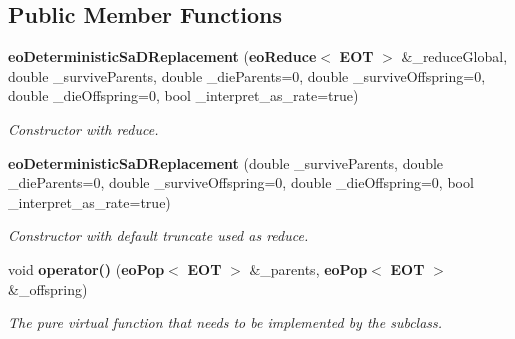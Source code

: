 \subsection*{Public Member Functions}
\begin{CompactItemize}
\item 
{\bf eo\-Deterministic\-Sa\-DReplacement} ({\bf eo\-Reduce}$<$ {\bf EOT} $>$ \&\_\-reduce\-Global, double \_\-survive\-Parents, double \_\-die\-Parents=0, double \_\-survive\-Offspring=0, double \_\-die\-Offspring=0, bool \_\-interpret\_\-as\_\-rate=true)\label{classeo_deterministic_sa_d_replacement_a0}

\begin{CompactList}\small\item\em Constructor with reduce. \item\end{CompactList}\item 
{\bf eo\-Deterministic\-Sa\-DReplacement} (double \_\-survive\-Parents, double \_\-die\-Parents=0, double \_\-survive\-Offspring=0, double \_\-die\-Offspring=0, bool \_\-interpret\_\-as\_\-rate=true)\label{classeo_deterministic_sa_d_replacement_a1}

\begin{CompactList}\small\item\em Constructor with default truncate used as reduce. \item\end{CompactList}\item 
void {\bf operator()} ({\bf eo\-Pop}$<$ {\bf EOT} $>$ \&\_\-parents, {\bf eo\-Pop}$<$ {\bf EOT} $>$ \&\_\-offspring)\label{classeo_deterministic_sa_d_replacement_a2}

\begin{CompactList}\small\item\em The pure virtual function that needs to be implemented by the subclass. \item\end{CompactList}\end{CompactItemize}
